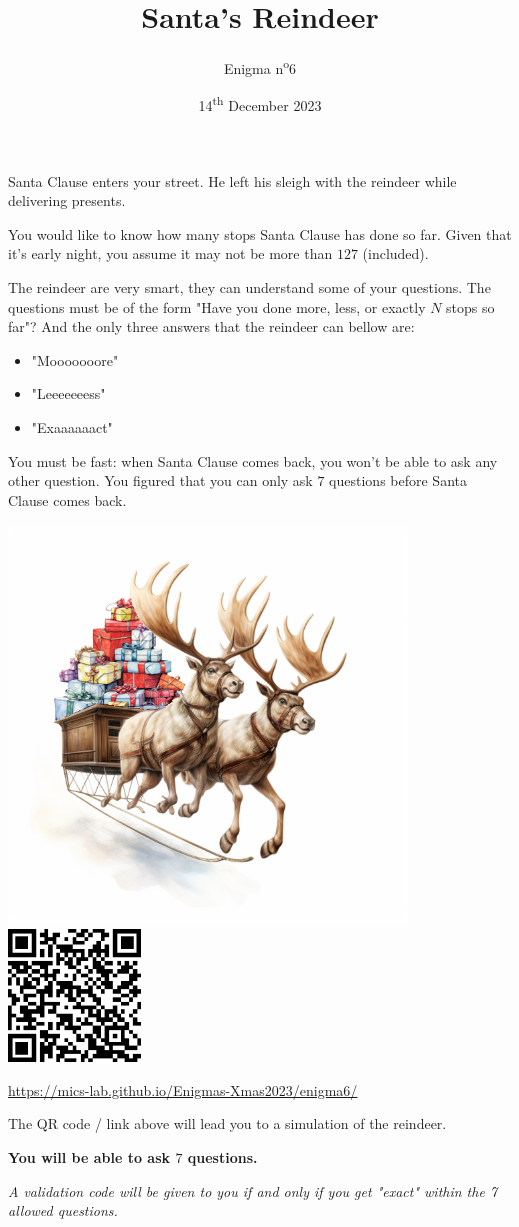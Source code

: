 \documentclass[a4paper, top=10mm]{article}
\title{\textbf{\huge{Santa's Reindeer}}}
\author{Enigma n\textsuperscript{o}6}
\date{14\textsuperscript{th} December 2023}
\begin{document}
	\maketitle
	
	Santa Clause enters your street.
	He left his sleigh with the reindeer while delivering presents.
	
	You would like to know how many stops Santa Clause has done so far.
	Given that it's early night, you assume it may not be more than $127$ (included).
	
	The reindeer are very smart, they can understand some of your questions.
	The questions must be of the form "Have you done more, less, or exactly $N$ stops so far"?
	And the only three answers that the reindeer can bellow are:
	\begin{itemize}
		\item "Mooooooore"
		\item "Leeeeeeess"
		\item "Exaaaaaact"
	\end{itemize}
	You must be fast: when Santa Clause comes back, you won't be able to ask any other question.
	You figured that you can only ask $7$ questions before Santa Clause comes back.
	
	\begin{center}
		\includegraphics[height=300pt]{06sleigh_with_presents.png}
		\hspace{1cm}
		\includegraphics[height=100pt]{06QR.png}
		
		\url{https://mics-lab.github.io/Enigmas-Xmas2023/enigma6/}
	\end{center}
	
	The QR code / link above will lead you to a simulation of the reindeer.
	
	\textbf{You will be able to ask $7$ questions.}
	
	\textit{A validation code will be given to you if and only if you get "exact" within the 7 allowed questions.}
	
\end{document}
